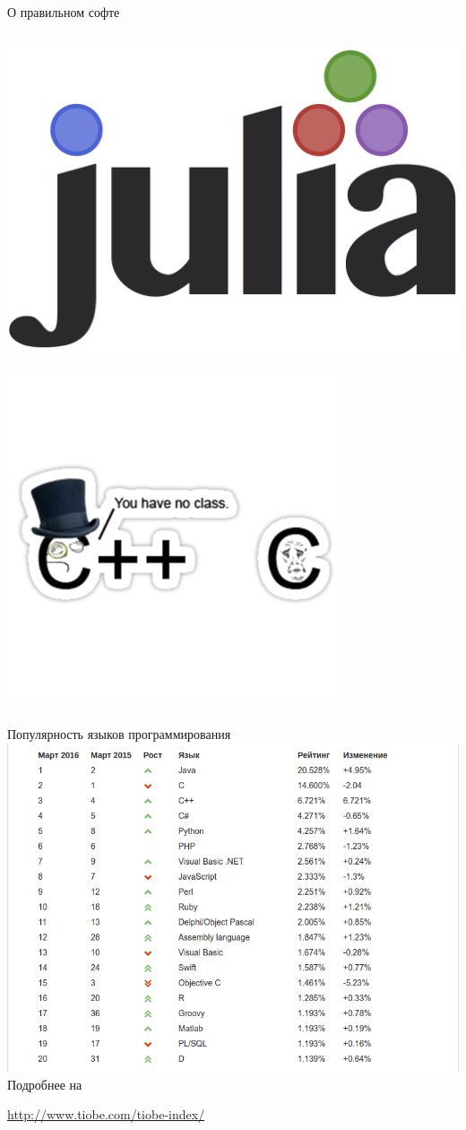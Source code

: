 \documentclass[newPxFont]{beamer}
\begin{document}
\begin{frame}{О правильном софте}
\begin{columns}
\begin{column}{.48\linewidth}
\includegraphics[width=0.6\linewidth]{julia-logo.png}	
\mbox{ } \\
\includegraphics[width=0.9\linewidth]{c-vs-cpp.png}
\end{column}
\end{columns}
\end{frame}


\begin{frame}{Популярность языков программирования}
\centering \includegraphics[width=0.7\linewidth]{lang.png}\\
\vspace{0.2cm}
Подробнее на \centerline {\url{http://www.tiobe.com/tiobe-index/}} 
\end{frame}
\end{document}

